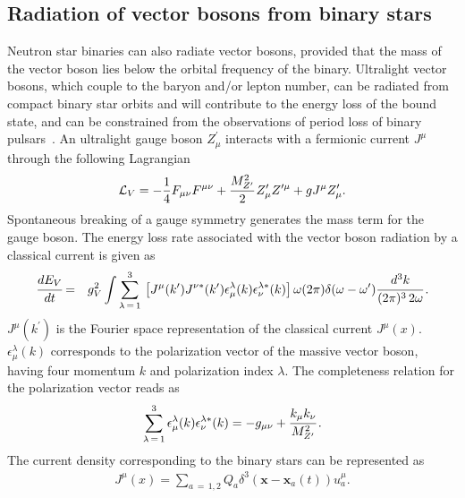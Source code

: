 \documentclass[aps,prd]{revtex4-2}
\begin{document}

\subsection{Radiation of vector bosons from binary stars}

Neutron star binaries can also radiate vector bosons, provided that the mass of the vector boson lies below the orbital frequency of the binary. Ultralight vector bosons, which couple to the baryon and/or lepton number, can be radiated from compact binary star orbits and will contribute to the energy loss of the bound state, and can be constrained from the observations of period loss of binary pulsars~\cite{KumarPoddar:2019ceq}. An ultralight gauge boson $Z^\prime_\mu$ interacts with a fermionic current $J^\mu$ through the following Lagrangian
\begin{eqnarray}\label{eq:vector-lagrangian}
    \mathcal{L}_{V} =-\frac{1}{4}F_{\mu \nu}F^{\mu \nu} + \cfrac{M^2_{Z^\prime}}{2}\,Z^\prime_{\mu}Z^{\prime\mu} + gJ^{\mu}Z^\prime_{\mu}.
\end{eqnarray}
Spontaneous breaking of a gauge symmetry generates the mass term for the gauge boson. The energy loss rate associated with the vector boson radiation by a classical current is given as
\begin{eqnarray}\label{eq:rate-of-energy-loss-vector}
    \cfrac{dE_{V}}{dt} &=& g_{V}^{2} \int  \sum\limits_{\lambda\,=\,1}^{3}\,\left[ J^{\mu}(k^\prime)J^{\nu *}(k^\prime)\epsilon^{\lambda}_{\mu}(k)\epsilon^{\lambda*}_{\nu}(k) \right] \omega (2\pi) \delta(\omega - \omega^{\prime})\cfrac{d^{3}k}{(2\pi)^{3}\,2\omega}\,.
\end{eqnarray}
$J^{\mu}(k^\prime)$ is the Fourier space representation of the classical current $J^{\mu}(x)$. $\epsilon^{\lambda}_{\mu}(k)$ corresponds to the polarization vector of the massive vector boson, having four momentum $k$ and polarization index $\lambda$. The completeness relation for the polarization vector reads as
\begin{eqnarray}\label{eq:polarisation-sum}
\sum\limits_{\lambda\,=\,1}^{3}\epsilon^{\lambda}_{\mu}(k)\epsilon^{\lambda*}_{\nu}(k) = -g_{\mu\nu} + \cfrac{k_{\mu} k_{\nu}}{M^2_{Z^\prime}}\,.
\end{eqnarray}
The current density corresponding to the binary stars can be represented as
\begin{eqnarray}\label{eq:current-density}
    J^{\mu}(x) = \sum\limits_{a\, =\, 1,2} Q_{a}\delta^{3} (\mathbf{x}-\mathbf{x}_a(t))u^{\mu}_a.
\end{eqnarray}
\end{document}
